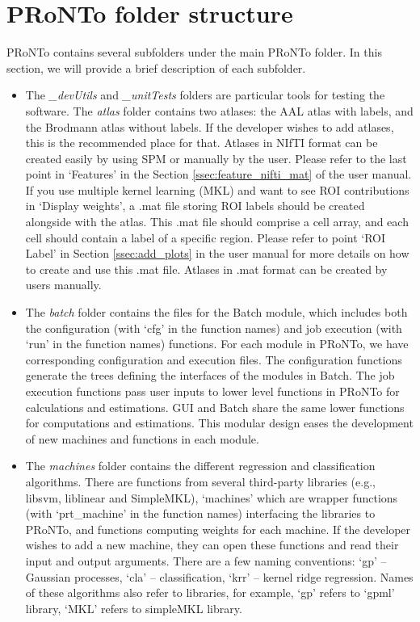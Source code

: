 \section{PRoNTo folder structure}

PRoNTo contains several subfolders under the main PRoNTo folder. In this section, we will provide a brief description of each subfolder.

\begin{itemize}
\item The \textit{\_devUtils} and \textit{\_unitTests} folders are particular tools for testing the software. The \textit{atlas} folder contains two atlases: the AAL atlas with labels, and the Brodmann atlas without labels. If the developer wishes to add atlases, this is the recommended place for that. Atlases in NIfTI format can be created easily by using SPM or manually by the user. Please refer to the last point in `Features' in the Section \ref{ssec:feature_nifti_mat} of the user manual. If you use multiple kernel learning (MKL) and want to see ROI contributions in `Display weights', a .mat file storing ROI labels should be created alongside with the atlas.  This .mat file should comprise a cell array, and each cell should contain a label of a specific region. Please refer to point `ROI Label' in Section \ref{ssec:add_plots} in the user manual for more details on how to create and use this .mat file. Atlases in .mat format can be created by users manually.
 
\item The \textit{batch} folder contains the files for the Batch module, which includes both the configuration (with `cfg' in the function names) and job execution (with `run' in the function names) functions. For each module in PRoNTo, we have corresponding configuration and execution files. The configuration functions generate the trees defining the interfaces of the modules in Batch. The job execution functions pass user inputs to lower level functions in PRoNTo for calculations and estimations. GUI and Batch share the same lower functions for computations and estimations. This modular design eases the development of new machines and functions in each module. 

\item The \textit{machines} folder contains the different regression and classification algorithms. There are functions from several third-party libraries (e.g., libsvm, liblinear and SimpleMKL), `machines' which are wrapper functions (with `prt\_machine' in the function names) interfacing the libraries to PRoNTo, and functions computing weights for each machine.  If the developer wishes to add a new machine, they can open these functions and read their input and output arguments. There are a few naming conventions: `gp' – Gaussian processes, `cla' – classification, `krr' – kernel ridge regression. Names of these algorithms also refer to libraries, for example, `gp' refers to `gpml' library, `MKL' refers to simpleMKL library.


\end{itemize}
